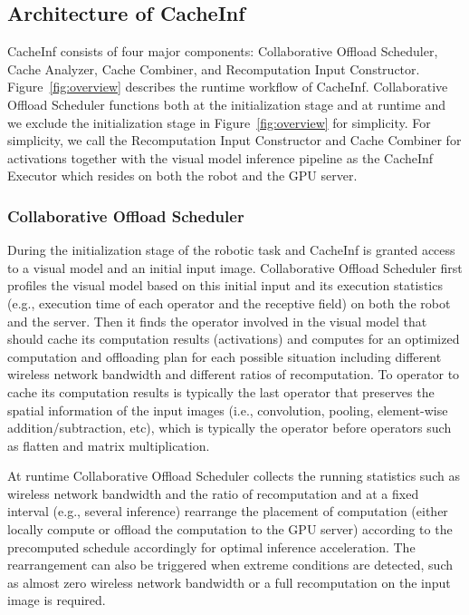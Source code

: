 \subsection{Architecture of CacheInf}
CacheInf consists of four major components: Collaborative Offload Scheduler, Cache Analyzer, Cache Combiner, and Recomputation Input Constructor.
Figure~\ref{fig:overview} describes the runtime workflow of CacheInf.
Collaborative Offload Scheduler functions both at the initialization stage and at runtime and we exclude the initialization stage in Figure~\ref{fig:overview} for simplicity.
For simplicity, we call the Recomputation Input Constructor and Cache Combiner for activations together with the visual model inference pipeline as the CacheInf Executor which resides on both the robot and the GPU server.

\subsubsection{Collaborative Offload Scheduler}
During the initialization stage of the robotic task and CacheInf is granted access to a visual model and an initial input image.
Collaborative Offload Scheduler first profiles the visual model based on this initial input and its execution statistics (e.g., execution time of each operator and the receptive field) on both the robot and the server.
Then it finds the operator involved in the visual model that should cache its computation results (activations) and computes for an optimized computation and offloading plan for each possible situation including different wireless network bandwidth and different ratios of recomputation.
To operator to cache its computation results is typically the last operator that preserves the spatial information of the input images (i.e., convolution, pooling, element-wise addition/subtraction, etc), which is typically the operator before operators such as flatten and matrix multiplication.

At runtime Collaborative Offload Scheduler collects the running statistics such as wireless network bandwidth and the ratio of recomputation and at a fixed interval (e.g., several inference) rearrange the placement of computation (either locally compute or offload the computation to the GPU server) according to the precomputed schedule accordingly for optimal inference acceleration.
The rearrangement can also be triggered when extreme conditions are detected, such as almost zero wireless network bandwidth or a full recomputation on the input image is required.


